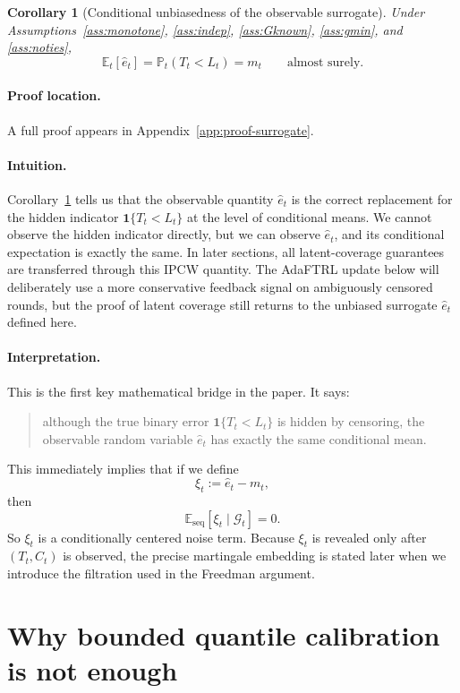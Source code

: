 \documentclass[11pt]{article}
\newtheorem{corollary}{Corollary}
\newcommand{\E}{\mathbb{E}}
\newcommand{\Prob}{\mathbb{P}}
\newcommand{\1}{\mathbf{1}}
\newcommand{\seq}{\mathrm{seq}}
\newcommand{\cG}{\mathcal{G}}
\begin{document}
\begin{corollary}[Conditional unbiasedness of the observable surrogate]
\label{cor:unbiased}
Under Assumptions~\ref{ass:monotone}, \ref{ass:indep}, \ref{ass:Gknown}, \ref{ass:gmin}, and \ref{ass:noties},
\[
\E_t[\hat e_t]=\Prob_t(T_t< L_t)=m_t
\qquad\text{almost surely.}
\]
\end{corollary}

\paragraph{Proof location.} A full proof appears in Appendix~\ref{app:proof-surrogate}.


\paragraph{Intuition.} Corollary~\ref{cor:unbiased} tells us that the observable quantity $\hat e_t$ is the correct replacement for the hidden indicator $\mathbf 1\{T_t< L_t\}$ at the level of conditional means. We cannot observe the hidden indicator directly, but we can observe $\hat e_t$, and its conditional expectation is exactly the same. In later sections, all latent-coverage guarantees are transferred through this IPCW quantity. The AdaFTRL update below will deliberately use a more conservative feedback signal on ambiguously censored rounds, but the proof of latent coverage still returns to the unbiased surrogate $\hat e_t$ defined here.


\paragraph{Interpretation.}
This is the first key mathematical bridge in the paper. It says:
\begin{quote}
although the true binary error $\1\{T_t< L_t\}$ is hidden by censoring, the observable random variable $\hat e_t$ has exactly the same conditional mean.
\end{quote}

This immediately implies that if we define
\[
\xi_t:=\hat e_t-m_t,
\]
then
\[
\E_{\seq}[\xi_t\mid \cG_t]=0.
\]
So $\xi_t$ is a conditionally centered noise term. Because $\xi_t$ is revealed only after $(T_t,C_t)$ is observed, the precise martingale embedding is stated later when we introduce the filtration used in the Freedman argument.

\section{Why bounded quantile calibration is not enough}
\label{sec:impossibility}
\end{document}
